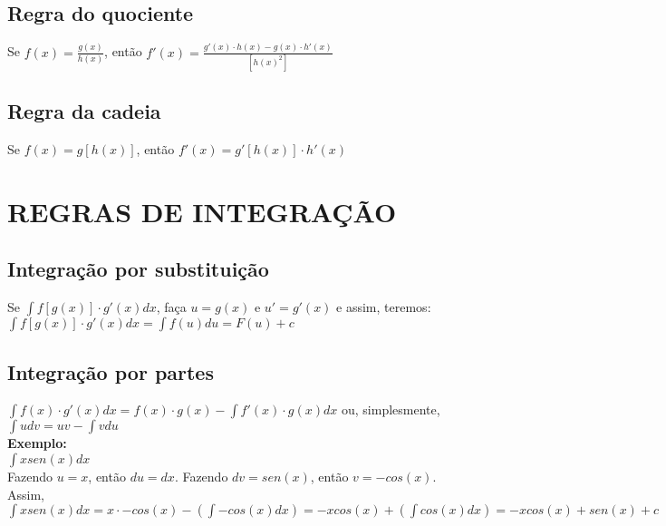 \documentclass[12pt]{article}
\begin{document}
\subsection{Regra do quociente}
Se $f(x) = \displaystyle\frac{g(x)}{h(x)}$, então $f'(x) = \displaystyle\frac{g'(x) \cdot h(x) - g(x) \cdot h'(x)}{[h(x)^2]}$

\subsection{Regra da cadeia}
Se $f(x) = g[h(x)]$, então $f'(x) = g'[h(x)] \cdot h'(x)$


\section{REGRAS DE INTEGRAÇÃO}

\subsection{Integração por substituição}

Se $\displaystyle\int{f[g(x)] \cdot g'(x)dx}$, faça $u = g(x)$ e $u' = g'(x)$ e assim, teremos:
$\displaystyle\int{f[g(x)] \cdot g'(x)dx} = \displaystyle\int{f(u)du} = F(u) + c$


\subsection{Integração por partes}

$\displaystyle\int{f(x) \cdot g'(x)dx} = f(x) \cdot g(x) - \displaystyle\int{f'(x) \cdot g(x)dx}$ ou, simplesmente,
$\displaystyle\int{udv} = uv - \displaystyle\int{vdu}$\\[4mm]
\textbf{Exemplo:}\\[2mm]
$\displaystyle\int{xsen(x)dx}$\\[2mm]
Fazendo $u = x$, então $du = dx$. Fazendo $dv = sen(x)$, então $v = -cos(x)$. Assim,\\[2mm]
$\displaystyle\int{xsen(x)dx} = x \cdot -cos(x) - \left(\displaystyle\int{-cos(x)dx}\right) = -xcos(x) + \left(\displaystyle\int{cos(x)dx}\right) = -xcos(x) + sen(x) + c$
\end{document}
